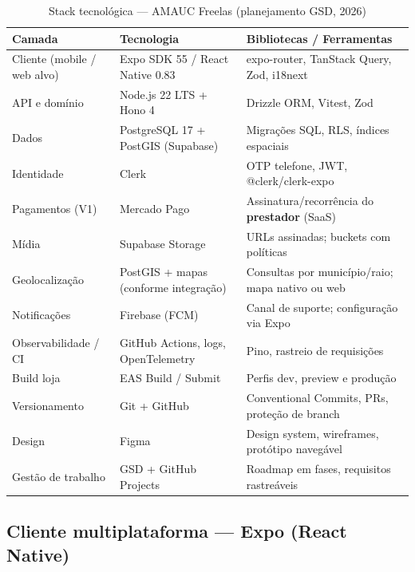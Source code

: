 \documentclass[12pt, a4paper]{article}
\begin{document}
\begin{table}[H]
  \centering
  \caption{Stack tecnológica --- AMAUC Freelas (planejamento GSD, 2026)}
  \label{tab:stack}
  \begin{tabularx}{\textwidth}{%
    >{\raggedright\arraybackslash}p{2.8cm}
    >{\raggedright\arraybackslash}p{3.8cm}
    >{\raggedright\arraybackslash}X}
  \toprule
  \rowcolor{ifcGreen!20}
  \textbf{Camada} & \textbf{Tecnologia} & \textbf{Bibliotecas / Ferramentas} \\
  \midrule
  Cliente (mobile / web alvo)
    & Expo SDK 55 / React Native 0.83
    & expo-router, TanStack Query, Zod, i18next \\
  \rowcolor{rowGray}
  API e domínio
    & Node.js 22 LTS + Hono 4
    & Drizzle ORM, Vitest, Zod \\
  Dados
    & PostgreSQL 17 + PostGIS (Supabase)
    & Migrações SQL, RLS, índices espaciais \\
  \rowcolor{rowGray}
  Identidade
    & Clerk
    & OTP telefone, JWT, @clerk/clerk-expo \\
  Pagamentos (V1)
    & Mercado Pago
    & Assinatura/recorrência do \textbf{prestador} (SaaS) \\
  \rowcolor{rowGray}
  Mídia
    & Supabase Storage
    & URLs assinadas; buckets com políticas \\
  Geolocalização
    & PostGIS + mapas (conforme integração)
    & Consultas por município/raio; mapa nativo ou web \\
  \rowcolor{rowGray}
  Notificações
    & Firebase (FCM)
    & Canal de suporte; configuração via Expo \\
  Observabilidade / CI
    & GitHub Actions, logs, OpenTelemetry
    & Pino, rastreio de requisições \\
  \rowcolor{rowGray}
  Build loja
    & EAS Build / Submit
    & Perfis dev, preview e produção \\
  Versionamento
    & Git + GitHub
    & Conventional Commits, PRs, proteção de branch \\
  \rowcolor{rowGray}
  Design
    & Figma
    & Design system, wireframes, protótipo navegável \\
  Gestão de trabalho
    & GSD + GitHub Projects
    & Roadmap em fases, requisitos rastreáveis \\
  \bottomrule
  \end{tabularx}
\end{table}

\subsection{Cliente multiplataforma --- Expo (React Native)}
\end{document}
